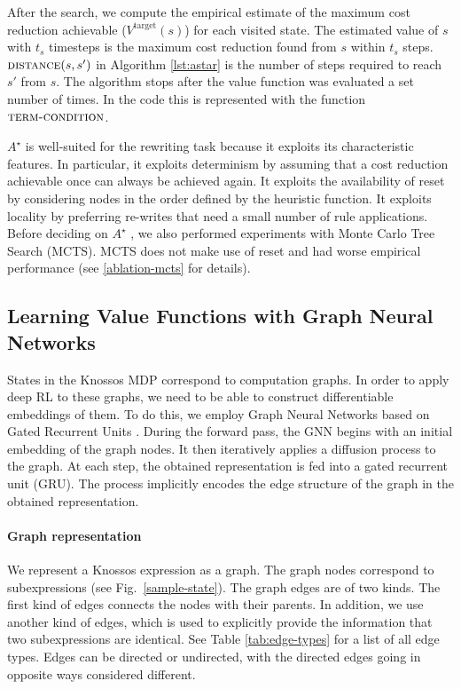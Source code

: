 \documentclass[fullpage,twocolumn]{article} %
\newcommand{\Vtarget}{V^\text{target}}
\begin{document}
After the search, we compute the empirical estimate of the maximum cost reduction achievable ($\Vtarget(s)$) for each visited state.  The estimated value of $s$ with $t_s$ timesteps is the maximum cost reduction found from $s$ within $t_s$ steps. $\textsc{distance}(s, s')$ in Algorithm \ref{lst:astar} is the number of steps required to reach $s'$ from $s$. The algorithm stops after the value function was evaluated a set number of times. In the code this is represented with the function $\textsc{term-condition}$.

$A^\star$ is well-suited for the rewriting task because it exploits its characteristic features. In particular, it exploits determinism by assuming that a cost reduction achievable once can always be achieved again. It exploits the availability of reset by considering nodes in the order defined by the heuristic function. It exploits locality by preferring re-writes that need a small number of rule applications. Before deciding on $A^\star$ , we also performed experiments with Monte Carlo Tree Search (MCTS). MCTS does not make use of reset and had worse empirical performance (see \ref{ablation-mcts} for details). 

\subsection{Learning Value Functions with Graph Neural Networks}
\label{sec-graph-nn}
States in the Knossos MDP correspond to computation graphs. In order to apply deep RL to these graphs, we need to be able to construct differentiable embeddings of them. To do this, we employ Graph Neural Networks based on Gated Recurrent Units \citep{DBLP:journals/corr/LiTBZ15}. During the forward pass, the GNN begins with an initial embedding of the graph nodes. It then iteratively applies a diffusion process to the graph. At each step, the obtained representation is fed into a gated recurrent unit (GRU). The process implicitly encodes the edge structure of the graph in the obtained representation.

\paragraph{Graph representation}
We represent a Knossos expression as a graph. The graph nodes correspond to subexpressions (see Fig.~\ref{sample-state}). The graph edges are of two kinds. The first kind of edges connects the nodes with their parents. In addition, we use another kind of edges, which is used to explicitly provide the information that two subexpressions are identical. See Table \ref{tab:edge-types} for a list of all edge types. Edges can be directed or undirected, with the directed edges going in opposite ways considered different.
\end{document}
